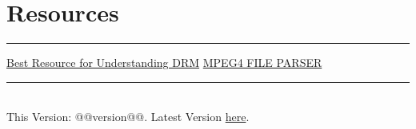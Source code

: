 \section{Resources}
\hrule

\medskip

\href{https://ottverse.com/eme-cenc-cdm-aes-keys-drm-digital-rights-management/}{Best Resource for Understanding DRM}
\href{http://mp4parser.com}{MPEG4 FILE PARSER}
\vfill
\hrule
~\\
This Version: @@version@@.  Latest Version \href{https://github.com/robert-will-brown/video-tech-cheatsheet}{here}.
